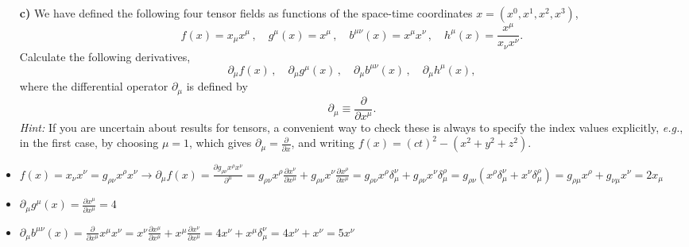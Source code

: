 \documentclass[11pt,a4paper]{report}
\newcounter{excount}[chapter]
\newenvironment{exercise}[1][]{\addtocounter{excount}{1} \noindent {\bf Problem
    \arabic{excount} \ \ #1}\hspace{2mm}}{\vspace{4mm}}
\begin{document}
\begin{exercise}
\begin{itemize}
\item[\bf c)] We have defined the following four tensor fields as functions of the space-time coordinates $x=(x^0,x^1,x^2,x^3)$,
\begin{equation}
f(x) =x_{\mu}x^{\mu}\,,\quad g^{\mu}(x) =x^{\mu}\,,\quad b^{\mu\nu}(x) =x^{\mu}x^{\nu}\,,\quad h^{\mu} (x) =\frac{x^{\mu}}{x_{\nu}x^{\nu}}.
\end{equation}
Calculate the following derivatives, 
\begin{equation}
\partial_{\mu} f(x)\,,\quad \partial_{\mu}g^{\mu}(x)\,,\quad \partial_{\mu} b^{\mu\nu}(x)\,,\quad \partial_{\mu} h^{\mu} (x),
\end{equation}
where the differential operator $\partial_{\mu}$ is defined by
\begin{equation}
\partial_{\mu}\equiv \frac{\partial}{\partial x^\mu}.
\end{equation}
{\it Hint:} If you are uncertain about results for tensors, a convenient way to check these is always to specify the index values explicitly, {\it e.g.}, in the first case, by choosing $\mu=1$, which gives $\partial_{\mu}=\frac{\partial}{\partial x}$, and writing $f(x)=(ct)^2-(x^2+y^2+z^2)$.
\item $f(x)=x_{\nu}x^{\nu} = g_{\rho 
\nu} x^{\rho}x^{\nu}  \rightarrow \partial_{\mu} f(x) = \frac{\partial g_{\rho 
\nu} x^{\rho}x^{\nu}}{\partial^{\mu}} = g_{\rho 
\nu} x^{\rho} \frac{ \partial x^{\nu}}{\partial x^{\mu}} + g_{\rho \nu} x^{\nu} \frac{\partial x^{\rho}}{\partial x{^\mu}}    = g_{\rho 
\nu} x^{\rho} \delta^{\nu}_{\mu} + g_{\rho \nu} x^{\nu} \delta_{\mu}^{\rho}=  g_{\rho 
\nu} ( x^{\rho} \delta^{\nu}_{\mu} + x^{\nu} \delta_{\mu}^{\rho} )=g_{\rho 
\mu} x^{\rho}+g_{\nu \mu} x^{\nu}=2x_{\mu}$
\item $\partial_{\mu}g^{\mu}(x)=\frac{\partial x^{\mu}}{\partial x^{\mu}}=4$ 
\item $ \partial_{\mu} b^{\mu\nu}(x)=\frac{\partial}{\partial x^{\mu}}  x^{\mu}x^{\nu}= x^{\nu}\frac{\partial x^{\mu}}{\partial x^{\mu}}+ x^{\mu}\frac{\partial x^{\nu}}{\partial x^{\mu}}=4x^{\nu}+x^{\mu} \delta_{\mu}^{\nu}=4x^{\nu}+x^{\nu}=5x^{\nu}$ 
\end{itemize}
\end{exercise}
\end{document}
